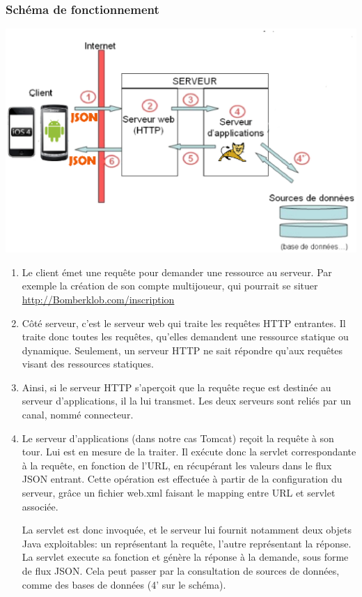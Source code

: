 \documentclass[a4paper,11pt]{report}
\begin{document}
		\subsubsection{Schéma de fonctionnement }
		
		\begin{center}
			\includegraphics[width=16cm]{./diagrammes/serveurappli.eps}
		\end{center}
		
		\begin{enumerate}
		 \item Le client émet une requête pour demander une
			ressource au serveur. Par exemple la création de son compte multijoueur,
			qui pourrait se situer \url{http://Bomberklob.com/inscription}
		\item Côté serveur, c'est le serveur web qui traite les
			requêtes HTTP entrantes. Il traite donc toutes les requêtes, qu'elles
			demandent une ressource statique ou dynamique. Seulement, un serveur HTTP ne
			sait répondre qu'aux requêtes visant des ressources statiques.
		\item Ainsi, si le serveur HTTP s'aperçoit que la requête reçue est destinée
		au serveur d'applications, il la lui transmet. Les deux serveurs sont reliés par un canal, nommé connecteur.
		
		\item Le serveur d'applications (dans notre cas Tomcat) reçoit la requête à
		son tour. Lui est en mesure de la traiter. Il exécute donc la servlet
		correspondante à la requête, en fonction de l'URL, en récupérant les valeurs
		dans le flux JSON entrant. Cette opération est effectuée à partir de la
		configuration du serveur, grâce un fichier web.xml faisant le mapping entre URL et servlet associée. 
		
		La servlet est donc invoquée, et le serveur lui fournit notamment deux objets
		Java exploitables: un représentant la requête, l'autre représentant la réponse.
		La servlet execute sa fonction et génère la réponse à la demande, sous forme
		de flux JSON. Cela peut passer par la consultation de sources de données,
		comme des bases de données (4' sur le schéma).		
		
		\end{enumerate}
		
\end{document}
